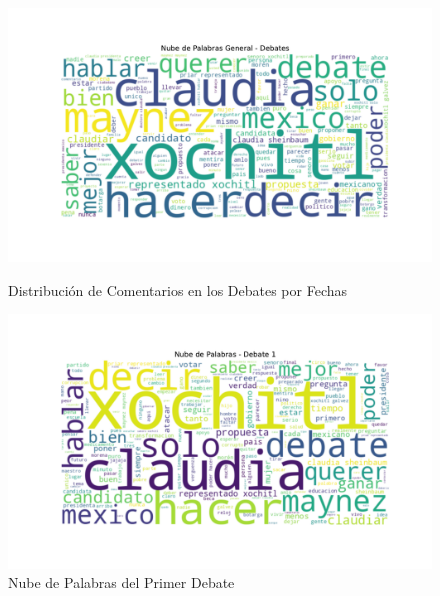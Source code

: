 \documentclass[10pt, a4paper]{article}
\begin{document}
	\vspace{-4mm}
	\begin{figure}[h!]
		\centering
		\begin{minipage}{0.49\textwidth} %
			\includegraphics[width=\linewidth]{nube_palabras_general.pdf} 
			\vspace{-10mm}
			\caption{Distribución de Comentarios en los Debates por Fechas}
			\label{fig:Nube de Palabras de los Debates}
		\end{minipage}
		\hfill %
		\begin{minipage}{0.49\textwidth}
			\includegraphics[width=\linewidth]{nube_palabras_debate_1.pdf}
			\vspace{-10mm}
			\caption{Nube de Palabras del Primer Debate}
			\label{fig:nubeDebate1}
		\end{minipage}
	\end{figure}
	
\end{document}
